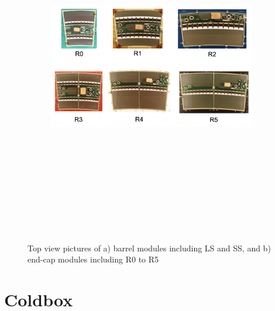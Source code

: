 \begin{figure}[h]
\begin{subfigure}[b]{1\textwidth}
        \includegraphics[width=14cm,height=15cm,keepaspectratio]{Figures/modules/EC_Modules.png}
        \caption{}\label{fig:endcap}
    \end{subfigure}
        \caption{Top view pictures of a) barrel modules including LS and SS, and b) end-cap modules including R0 to R5\cite{tishelman2024quality} }
        \label{fig:picModules-large}
\end{figure}

\newpage
\section{Coldbox}
